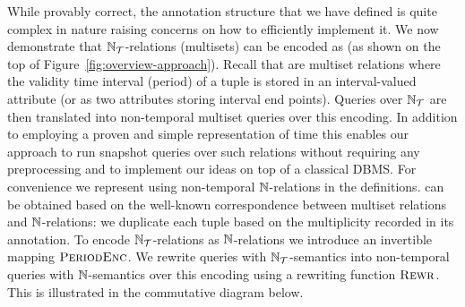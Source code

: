 While provably correct, the annotation structure that we have defined is quite complex in nature raising concerns on how to efficiently implement it. We now demonstrate that ${{\mathbb{N}}}_{\mathcal{T}}$-relations (multisets) can be encoded as \SQLrels{} (as shown  on the top of Figure~\ref{fig:overview-approach}).
Recall that \SQLrels{} are multiset relations where the validity time interval (period) of a tuple is stored in an interval-valued attribute (or as two attributes storing interval end points).
Queries over ${{\mathbb{N}}}_{\mathcal{T}}$ are then translated into non-temporal multiset queries over this encoding.
In addition to employing a proven and simple representation of time this enables our approach to run snapshot queries over such relations without requiring any preprocessing and to implement our ideas on top of a
classical DBMS.
For convenience we represent \SQLrels{} using non-temporal ${\mathbb{N}}$-relations in the definitions. \SQLrels{} can be obtained based on the well-known correspondence between multiset relations and ${\mathbb{N}}$-relations: we duplicate each tuple based on the multiplicity recorded in its annotation.
To encode ${{\mathbb{N}}}_{\mathcal{T}}$-relations as ${\mathbb{N}}$-relations we introduce an invertible mapping $\textsc{PeriodEnc}$. We
rewrite queries with ${{\mathbb{N}}}_{\mathcal{T}}$-semantics into non-temporal queries with
${\mathbb{N}}$-semantics over this encoding using a rewriting function
$\textsc{Rewr}$. This is illustrated in the commutative diagram below.
%
